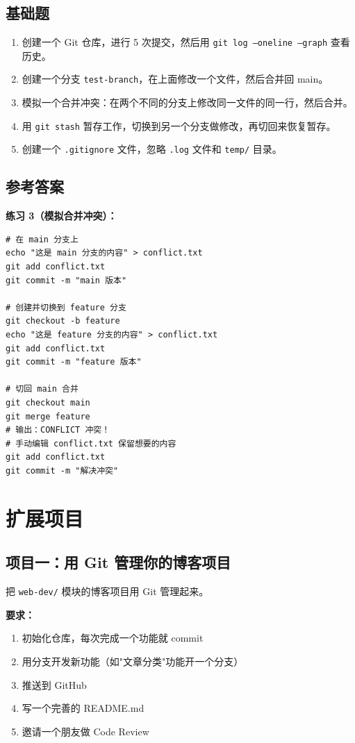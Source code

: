 \documentclass[a4paper,12pt]{ctexart}
\begin{document}
\subsection*{基础题}

\begin{enumerate}
  \item 创建一个 Git 仓库，进行 5 次提交，然后用 \texttt{git log --oneline --graph} 查看历史。
  \item 创建一个分支 \texttt{test-branch}，在上面修改一个文件，然后合并回 main。
  \item 模拟一个合并冲突：在两个不同的分支上修改同一文件的同一行，然后合并。
  \item 用 \texttt{git stash} 暂存工作，切换到另一个分支做修改，再切回来恢复暂存。
  \item 创建一个 \texttt{.gitignore} 文件，忽略 \texttt{.log} 文件和 \texttt{temp/} 目录。
\end{enumerate}

\subsection*{参考答案}

\textbf{练习 3（模拟合并冲突）：}
\begin{verbatim}
# 在 main 分支上
echo "这是 main 分支的内容" > conflict.txt
git add conflict.txt
git commit -m "main 版本"

# 创建并切换到 feature 分支
git checkout -b feature
echo "这是 feature 分支的内容" > conflict.txt
git add conflict.txt
git commit -m "feature 版本"

# 切回 main 合并
git checkout main
git merge feature
# 输出：CONFLICT 冲突！
# 手动编辑 conflict.txt 保留想要的内容
git add conflict.txt
git commit -m "解决冲突"
\end{verbatim}

\section*{扩展项目}

\subsection*{项目一：用 Git 管理你的博客项目}

把 \texttt{web-dev/} 模块的博客项目用 Git 管理起来。

\textbf{要求：}
\begin{enumerate}
  \item 初始化仓库，每次完成一个功能就 commit
  \item 用分支开发新功能（如"文章分类"功能开一个分支）
  \item 推送到 GitHub
  \item 写一个完善的 README.md
  \item 邀请一个朋友做 Code Review
\end{enumerate}
\end{document}
